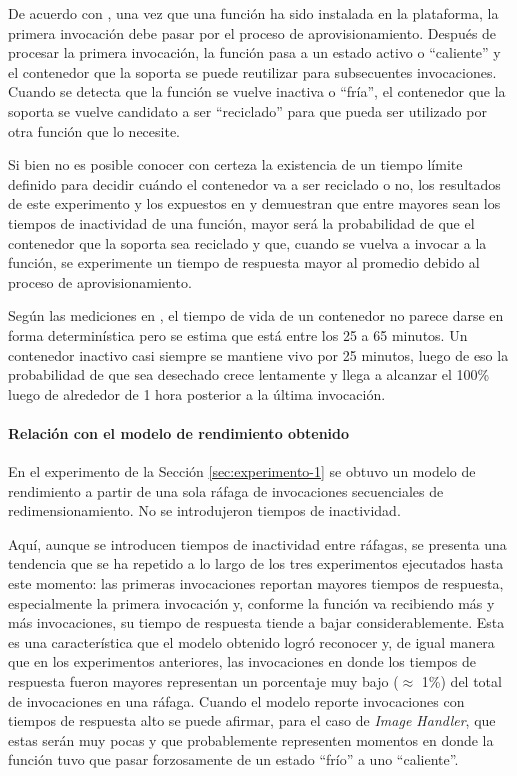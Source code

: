 De acuerdo con \cite{cold-starts-aws-lambda-1}, una vez que una función ha sido instalada en la plataforma, la primera invocación debe pasar por el proceso de aprovisionamiento. Después de procesar la primera invocación, la función pasa a un estado activo o ``caliente'' y el contenedor que la soporta se puede reutilizar para subsecuentes invocaciones. Cuando se detecta que la función se vuelve inactiva o ``fría'', el contenedor que la soporta se vuelve candidato a ser ``reciclado'' para que pueda ser utilizado por otra función que lo necesite.

Si bien no es posible conocer con certeza la existencia de un tiempo límite definido para decidir cuándo el contenedor va a ser reciclado o no, los resultados de este experimento y los expuestos en \cite{cold-starts-aws-lambda-1} y \cite{cold-starts-aws-lambda-2} demuestran que entre mayores sean los tiempos de inactividad de una función, mayor será la probabilidad de que el contenedor que la soporta sea reciclado y que, cuando se vuelva a invocar a la función, se experimente un tiempo de respuesta mayor al promedio debido al proceso de aprovisionamiento. 

Según las mediciones en \cite{cold-starts-aws-lambda-1}, el tiempo de vida de un contenedor no parece darse en forma determinística pero se estima que está entre los 25 a 65 minutos. Un contenedor inactivo casi siempre se mantiene vivo por 25 minutos, luego de eso la probabilidad de que sea desechado crece lentamente y llega a alcanzar el 100\% luego de alrededor de 1 hora posterior a la última invocación.

\paragraph{Relación con el modelo de rendimiento obtenido} En el experimento de la Sección \ref{sec:experimento-1} se obtuvo un modelo de rendimiento a partir de una sola ráfaga de invocaciones secuenciales de redimensionamiento. No se introdujeron tiempos de inactividad. 

Aquí, aunque se introducen tiempos de inactividad entre ráfagas, se presenta una tendencia que se ha repetido a lo largo de los tres experimentos ejecutados hasta este momento: las primeras invocaciones reportan mayores tiempos de respuesta, especialmente la primera invocación y, conforme la función va recibiendo más y más invocaciones, su tiempo de respuesta tiende a bajar considerablemente. Esta es una característica que el modelo obtenido logró reconocer y, de igual manera que en los experimentos anteriores, las invocaciones en donde los tiempos de respuesta fueron mayores representan un porcentaje muy bajo ($\approx$ 1\%) del total de invocaciones en una ráfaga. Cuando el modelo reporte invocaciones con tiempos de respuesta alto se puede afirmar, para el caso de \emph{Image Handler}, que estas serán muy pocas y que probablemente representen momentos en donde la función tuvo que pasar forzosamente de un estado ``frío'' a uno ``caliente''.


